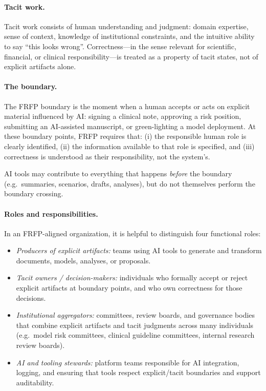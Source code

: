 \paragraph{Tacit work.}
Tacit work consists of human understanding and judgment:
domain expertise, sense of context, knowledge of institutional constraints, and the intuitive ability to say ``this looks wrong''.
Correctness---in the sense relevant for scientific, financial, or clinical responsibility---is treated as a property of tacit states, not of explicit artifacts alone.

\paragraph{The boundary.}
The FRFP boundary is the moment when a human accepts or acts on explicit material influenced by AI:
signing a clinical note, approving a risk position, submitting an AI-assisted manuscript, or green-lighting a model deployment.
At these boundary points, FRFP requires that:
(i) the responsible human role is clearly identified,
(ii) the information available to that role is specified,
and (iii) correctness is understood as their responsibility, not the system's.

AI tools may contribute to everything that happens \emph{before} the boundary (e.g.\ summaries, scenarios, drafts, analyses), but do not themselves perform the boundary crossing.

\paragraph{Roles and responsibilities.}
In an FRFP-aligned organization, it is helpful to distinguish four functional roles:

\begin{itemize}
  \item \emph{Producers of explicit artifacts:}
  teams using AI tools to generate and transform documents, models, analyses, or proposals.

  \item \emph{Tacit owners / decision-makers:}
  individuals who formally accept or reject explicit artifacts at boundary points, and who own correctness for those decisions.

  \item \emph{Institutional aggregators:}
  committees, review boards, and governance bodies that combine explicit artifacts and tacit judgments across many individuals (e.g.\ model risk committees, clinical guideline committees, internal research review boards).

  \item \emph{AI and tooling stewards:}
  platform teams responsible for AI integration, logging, and ensuring that tools respect explicit/tacit boundaries and support auditability.
\end{itemize}

